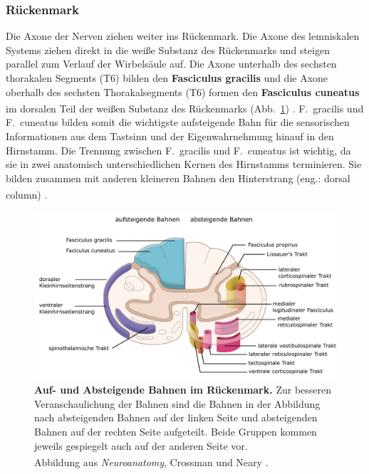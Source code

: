 \subsubsection*{Rückenmark}
Die Axone der Nerven ziehen weiter ins Rückenmark. Die Axone des lemniskalen Systems ziehen direkt in die weiße Substanz des Rückenmarks und steigen parallel zum Verlauf der Wirbelsäule auf. Die Axone unterhalb des sechsten thorakalen Segments (T6) bilden den \textbf{Fasciculus gracilis}  und die Axone oberhalb des sechsten Thorakalsegments (T6) formen den \textbf{Fasciculus cuneatus}  im dorsalen Teil der weißen Substanz des Rückenmarks (Abb.~\ref{fig:bahnen_rueckenmark}) \textsuperscript{\cite[Kap.~8]{paxinos2014rat}}. F.~gracilis und F.~cuneatus bilden somit die wichtigste aufsteigende Bahn für die sensorischen Informationen aus dem Tastsinn und der Eigenwahrnehmung hinauf in den Hirnstamm. 
Die Trennung zwischen F.~gracilis und F.~cuneatus ist wichtig, da sie in zwei anatomisch unterschiedlichen Kernen des Hirnstamms terminieren. Sie bilden zusammen mit anderen kleineren Bahnen den Hinterstrang (eng.: dorsal column) \textsuperscript{\cite[Kap.~22]{kandel2013principles}}. 

\begin{figure}[H]
    \centering
    \includegraphics [width = \textwidth]
    {pictures/somatosensory/aufabsteigendeBahnen_Rueckenmark.pdf}
    \caption[Auf- und Absteigende Bahnen im Rückenmark]{\textbf{Auf- und Absteigende Bahnen im Rückenmark.} Zur besseren Veranschaulichung der Bahnen sind die Bahnen in der Abbildung nach absteigenden Bahnen auf der linken Seite und absteigenden Bahnen auf der rechten Seite aufgeteilt. Beide Gruppen kommen jeweils gespiegelt auch auf der anderen Seite vor. \\
    Abbildung aus \textit{Neuroanatomy}, Crossman und Neary
    \textsuperscript{\cite[Kap.~8]{crossman2014neuroanatomy}}.}
    \label{fig:bahnen_rueckenmark}
\end{figure}

